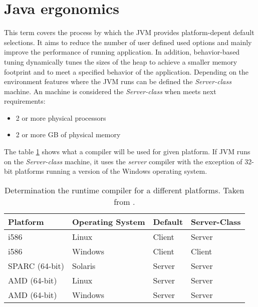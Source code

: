\documentclass[
  digital, %
  oneside,
  notable, %
  nolof,     %
  nolot     %
]{fithesis3}
\begin{document}
\section{Java ergonomics}\label{secerg}
This term covers the process by which the JVM provides platform-depent default selections. It aims to reduce the number of user defined used options and mainly improve the performance of running application. In addition, behavior-based tuning dynamically tunes the sizes of the heap to achieve a smaller memory footprint and to meet a specified behavior of the application. Depending on the environment features where the JVM runs can be defined the \textit{Server-class} machine. An machine is considered the \textit{Server-class} when meets next requirements:
\begin{itemize}
	\item 2 or more physical processors
	\item 2 or more GB of physical memory
\end{itemize}
The table \ref{figerg} shows what a compiler will be used for given platform. If JVM runs on the \textit{Server-class} machine, it uses the \textit{server} compiler with the exception of 32-bit platforms running a version of the Windows operating system.

\begin{table}[]
	\centering
	\begin{tabular}{|l|l|l|l|}
		\hline
		\textbf{Platform} & \textbf{Operating System} & \textbf{Default} & \textbf{Server-Class} \\ \hline
		i586              & Linux                     & Client           & Server                           \\ \hline
		i586              & Windows                   & Client           & Client                           \\ \hline
		SPARC (64-bit)    & Solaris                   & Server           & Server                           \\ \hline
		AMD (64-bit)      & Linux                     & Server           & Server                           \\ \hline
		AMD (64-bit)      & Windows                   & Server           & Server                           \\ \hline
	\end{tabular}
	\caption{Determination the runtime compiler for a different platforms. Taken from \cite{ergonomics}.}
	\label{figerg}
\end{table}
\end{document}
